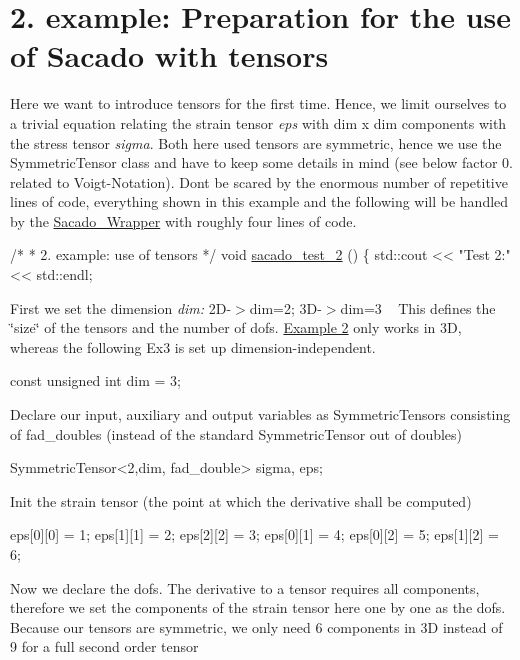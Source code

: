  \hypertarget{index_Ex2}{}\section{2. example\+: Preparation for the use of Sacado with tensors}\label{index_Ex2}
Here we want to introduce tensors for the first time. Hence, we limit ourselves to a trivial equation relating the strain tensor {\itshape eps} with dim x dim components with the stress tensor {\itshape sigma}. Both here used tensors are symmetric, hence we use the Symmetric\+Tensor class and have to keep some details in mind (see below factor 0. related to Voigt-\/\+Notation). Don\textquotesingle{}t be scared by the enormous number of repetitive lines of code, everything shown in this example and the following will be handled by the \hyperlink{namespaceSacado__Wrapper}{Sacado\+\_\+\+Wrapper} with roughly four lines of code. 
\begin{DoxyCode}
\textcolor{comment}{/*}
\textcolor{comment}{ * 2. example: use of tensors}
\textcolor{comment}{ */}
\textcolor{keywordtype}{void} \hyperlink{Sacado__example_8cc_a8ef4ff1e9526ca8451cdcd1678366d2c}{sacado\_test\_2} ()
\{
    std::cout << \textcolor{stringliteral}{"Test 2:"} << std::endl;
\end{DoxyCode}
 First we set the dimension {\itshape dim\+:} 2\+D-\/$>$dim=2; 3\+D-\/$>$dim=3 ~\newline
 This defines the \char`\"{}size\char`\"{} of the tensors and the number of dofs. \hyperlink{index_Ex2}{Example 2} only works in 3D, whereas the following Ex3 is set up dimension-\/independent. 
\begin{DoxyCode}
\textcolor{keyword}{const} \textcolor{keywordtype}{unsigned} \textcolor{keywordtype}{int} dim = 3;
\end{DoxyCode}
 Declare our input, auxiliary and output variables as Symmetric\+Tensors consisting of fad\+\_\+doubles (instead of the standard Symmetric\+Tensor out of doubles) 
\begin{DoxyCode}
SymmetricTensor<2,dim, fad\_double> sigma, eps;
\end{DoxyCode}
 Init the strain tensor (the point at which the derivative shall be computed) 
\begin{DoxyCode}
eps[0][0] = 1;
eps[1][1] = 2;
eps[2][2] = 3;
eps[0][1] = 4;
eps[0][2] = 5;
eps[1][2] = 6;
\end{DoxyCode}
 Now we declare the dofs. The derivative to a tensor requires all components, therefore we set the components of the strain tensor here one by one as the dofs. Because our tensors are symmetric, we only need 6 components in 3D instead of 9 for a full second order tensor 
